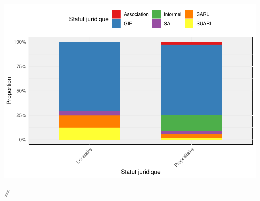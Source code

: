 \documentclass[
]{article}
\newenvironment{Shaded}{\begin{snugshade}}{\end{snugshade}}
\newcommand{\CommentTok}[1]{\textcolor[rgb]{0.56,0.35,0.01}{\textit{#1}}}
\begin{document}
\includegraphics{PROJET_files/figure-latex/unnamed-chunk-20-1.pdf}

\begin{Shaded}
\begin{Highlighting}[]
\CommentTok{\#}
\end{Highlighting}
\end{Shaded}
\end{document}
